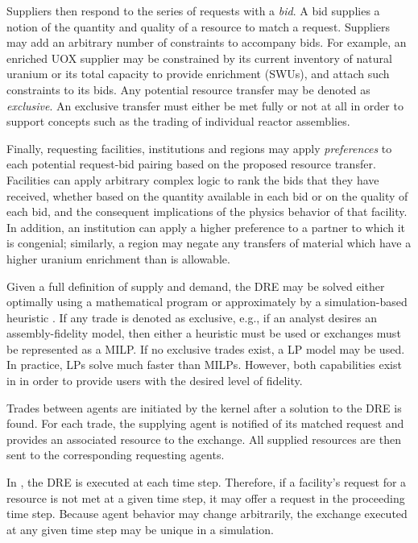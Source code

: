 Suppliers then respond to the series of requests with a \textit{bid}. A bid
supplies a notion of the quantity and quality of a resource to match a
request. Suppliers may add an arbitrary number of constraints to accompany
bids. For example, an enriched \gls{UOX} supplier may be constrained by its current
inventory of natural uranium or its total capacity to provide enrichment (SWUs), and
attach such constraints to its bids. Any potential resource transfer may be denoted as
\textit{exclusive}. An exclusive transfer must either be met fully or not at all
in order to support concepts such as the trading of individual reactor
assemblies.

Finally, requesting facilities, institutions and regions may apply
\textit{preferences} to each potential request-bid pairing based on the proposed
resource transfer. Facilities can apply arbitrary complex logic to rank the bids
that they have received, whether based on the quantity available in each bid or
on the quality of each bid, and the consequent implications of the physics behavior
of that facility. In addition, an institution can apply a higher preference to a
partner to which it is congenial; similarly, a region may negate any transfers
of material which have a higher uranium enrichment than is allowable.

Given a full definition of supply and demand, the \gls{DRE} may be solved either
optimally using a mathematical program or approximately by a simulation-based
heuristic \cite{gidden_agent-based_2014}. If any trade is denoted as exclusive, e.g., if an
analyst desires an assembly-fidelity model, then either a heuristic must be used
or exchanges must be represented as a \gls{MILP}. If no exclusive trades exist,
a \gls{LP} model may be used. In practice, LPs solve much faster than
\gls{MILP}s. However, both capabilities exist in \Cyclus in order to
provide users with the desired level of fidelity.

Trades between agents are initiated by the \Cyclus kernel after a solution to
the \gls{DRE} is found. For each trade, the supplying agent is notified of its
matched request and provides an associated resource to the exchange. All
supplied resources are then sent to the corresponding requesting agents.

In \Cyclus, the \gls{DRE} is executed at each time step. Therefore, if a
facility's request for a resource is not met at a given time step, it may offer
a request in the proceeding time step. Because agent behavior may change
arbitrarily, the exchange executed at any given time step may be unique in a
simulation.

